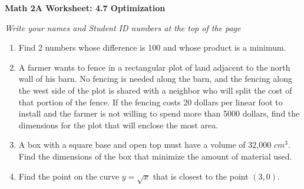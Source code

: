 \documentclass[12pt,fleqn]{article}
\begin{document}
\begin{center}
	\textbf{Math 2A Worksheet: 4.7 Optimization}
\end{center}

\emph{Write your names and Student ID numbers at the top of the page}

\begin{enumerate}
\item Find 2 numbers whose difference is 100 and whose product is a minimum.\vfill


\item A farmer wants to fence in a rectangular plot of land adjacent to the north wall of his barn.  No fencing is needed along the barn, and the fencing along the west side of the plot is shared with a neighbor who will split the cost of that portion of the fence.  If the fencing costs 20 dollars per linear foot to install and the farmer is not willing to spend more than 5000 dollars, find the dimensions for the plot that will enclose the most area.\vfill

\newpage


\item A box with a square base and open top must have a volume of 32,000 $cm^3$.  Find the dimensions of the box that minimize the amount of material used.\\\vfill

\item Find the point on the curve $y=\sqrt{x}$ that is closest to the point $(3,0)$.\vfill

\end{enumerate}
\end{document}
